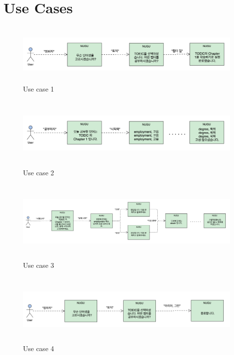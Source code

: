 \documentclass[conference]{IEEEtran}
\begin{document}
\section{Use Cases}
\begin{figure}[h]
    \centering
    \hfill
    \includegraphics[width=\textwidth, height=3cm]{images/usecase1.png}
    \hfill
    \caption{Use case 1}
\end{figure}
\begin{figure}[h]
    \centering
    \hfill
    \includegraphics[width=\textwidth, height=3.5cm]{images/usecase2.png}
    \hfill
    \caption{Use case 2}
\end{figure}
\begin{figure}[h]
    \centering
    \hfill
    \includegraphics[width=\textwidth, height=4cm]{images/usecase3.png}
    \hfill
    \caption{Use case 3}
\end{figure}
\begin{figure}[h]
    \centering
    \hfill
    \includegraphics[width=\textwidth, height=3.5cm]{images/usecase4.png}
    \hfill
    \caption{Use case 4}
\end{figure}
\end{document}

